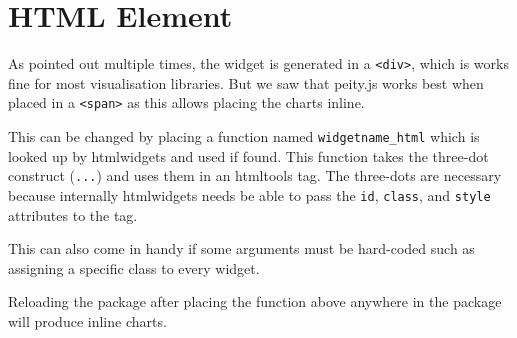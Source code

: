 \documentclass[
]{krantz}
\makeatletter
\newenvironment{Shaded}{\begin{snugshade}}{\end{snugshade}}
\newcommand{\ControlFlowTok}[1]{\textcolor[rgb]{0.27,0.27,0.27}{\textbf{#1}}}
\newcommand{\DataTypeTok}[1]{\textcolor[rgb]{0.27,0.27,0.27}{#1}}
\newcommand{\KeywordTok}[1]{\textcolor[rgb]{0.27,0.27,0.27}{\textbf{#1}}}
\newcommand{\NormalTok}[1]{#1}
\newcommand{\OperatorTok}[1]{\textcolor[rgb]{0.43,0.43,0.43}{\textbf{#1}}}
\newcommand{\StringTok}[1]{\textcolor[rgb]{0.5,0.5,0.5}{#1}}
\newenvironment{kframe}{%
\medskip{}
\setlength{\fboxsep}{.8em}
 \def\at@end@of@kframe{}%
 \ifinner\ifhmode%
  \def\at@end@of@kframe{\end{minipage}}%
  \begin{minipage}{\columnwidth}%
 \fi\fi%
 \def\FrameCommand##1{\hskip\@totalleftmargin \hskip-\fboxsep
 \colorbox{shadecolor}{##1}\hskip-\fboxsep
     \hskip-\linewidth \hskip-\@totalleftmargin \hskip\columnwidth}%
 \MakeFramed {\advance\hsize-\width
   \@totalleftmargin\z@ \linewidth\hsize
   \@setminipage}}%
 {\par\unskip\endMakeFramed%
 \at@end@of@kframe}
\renewenvironment{Shaded}{\begin{kframe}}{\end{kframe}}
\makeatother
\begin{document}
\hypertarget{widgets-realistic-html-element}{%
\section{HTML Element}\label{widgets-realistic-html-element}}

As pointed out multiple times, the widget is generated in a \texttt{\textless{}div\textgreater{}}, which is works fine for most visualisation libraries. But we saw that peity.js works best when placed in a \texttt{\textless{}span\textgreater{}} as this allows placing the charts inline.

This can be changed by placing a function named \texttt{widgetname\_html} which is looked up by htmlwidgets and used if found. This function takes the three-dot construct (\texttt{...}) and uses them in an htmltools tag. The three-dots are necessary because internally htmlwidgets needs be able to pass the \texttt{id}, \texttt{class}, and \texttt{style} attributes to the tag.

\begin{Shaded}
\end{Shaded}

This can also come in handy if some arguments must be hard-coded such as assigning a specific class to every widget.

\begin{Shaded}
\end{Shaded}

Reloading the package after placing the function above anywhere in the package will produce inline charts.
\end{document}
